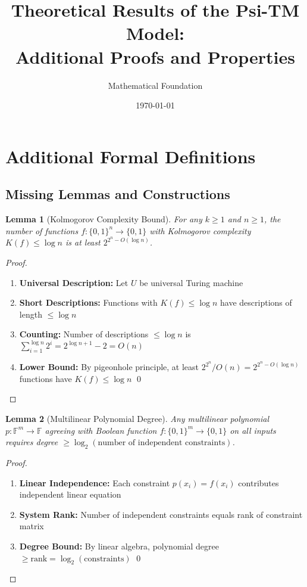 \documentclass[11pt]{article}
\title{Theoretical Results of the Psi-TM Model:\\
Additional Proofs and Properties}
\author{Mathematical Foundation}
\date{\today}
\newtheorem{lemma}{Lemma}
\begin{document}
\maketitle

\section{Additional Formal Definitions}

\subsection{Missing Lemmas and Constructions}

\begin{lemma}[Kolmogorov Complexity Bound]
For any $k \geq 1$ and $n \geq 1$, the number of functions $f: \{0,1\}^n \to \{0,1\}$ with Kolmogorov complexity $K(f) \leq \log n$ is at least $2^{2^n - O(\log n)}$.
\end{lemma}

\begin{proof}
\begin{enumerate}
\item \textbf{Universal Description:} Let $U$ be universal Turing machine
\item \textbf{Short Descriptions:} Functions with $K(f) \leq \log n$ have descriptions of length $\leq \log n$
\item \textbf{Counting:} Number of descriptions $\leq \log n$ is $\sum_{i=1}^{\log n} 2^i = 2^{\log n + 1} - 2 = O(n)$
\item \textbf{Lower Bound:} By pigeonhole principle, at least $2^{2^n}/O(n) = 2^{2^n - O(\log n)}$ functions have $K(f) \leq \log n$ \qed
\end{enumerate}
\end{proof}

\begin{lemma}[Multilinear Polynomial Degree]
Any multilinear polynomial $p: \mathbb{F}^m \to \mathbb{F}$ agreeing with Boolean function $f: \{0,1\}^m \to \{0,1\}$ on all inputs requires degree $\geq \log_2(\text{number of independent constraints})$.
\end{lemma}

\begin{proof}
\begin{enumerate}
\item \textbf{Linear Independence:} Each constraint $p(x_i) = f(x_i)$ contributes independent linear equation
\item \textbf{System Rank:} Number of independent constraints equals rank of constraint matrix
\item \textbf{Degree Bound:} By linear algebra, polynomial degree $\geq \text{rank} = \log_2(\text{constraints})$ \qed
\end{enumerate}
\end{proof}
\end{document}
